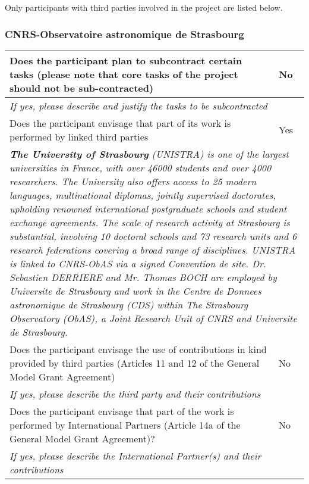 Only participants with third parties involved in the project are listed below.

\subsubsection{CNRS-Observatoire astronomique de Strasbourg}
\begin{tabular}{|p{}|p{}|}\hline
Does the participant plan to subcontract certain tasks (please note that core
tasks of the project should not be sub-contracted) & No\\\hline
%
\multicolumn{2}{|p{\textwidth}|}{
 \textit{If yes, please describe and justify the tasks to be subcontracted}
 }
 \\\hline
%   
Does the participant envisage that part of its work is performed by linked
third parties & Yes\\\hline
%
 \multicolumn{2}{|p{\textwidth}|}{\textit{\textbf{The University of Strasbourg} (UNISTRA) is 
 one of the largest universities in  France, with over 46000 students and over 4000 
 researchers. The University also offers 
 access to 25 modern languages, multinational diplomas, jointly supervised doctorates, 
 upholding renowned international postgraduate schools and student exchange agreements. 
 The scale of research activity at Strasbourg is substantial, involving 10 doctoral schools and 
 73 research units and 6 research federations covering a broad range of disciplines. UNISTRA is linked to
 CNRS-ObAS via a signed Convention de site. Dr. Sebastien DERRIERE and Mr. Thomas 
 BOCH are employed by Universite de Strasbourg and work in the Centre de Donnees 
 astronomique de Strasbourg (CDS) within The Strasbourg Observatory (ObAS), a Joint Research 
 Unit of CNRS and Universite
 de Strasbourg.}}\\\hline
Does the participant envisage the use of contributions in kind provided by third parties (Articles 11 and 12 of
the General Model Grant Agreement) & No\\\hline
%
\multicolumn{2}{|p{\textwidth}|}{
\textit{If yes, please describe the third party and their contributions}
}
\\ \hline
%  
Does the participant envisage that part of the work is performed by International Partners (Article 14a of the
General Model Grant Agreement)? & No\\\hline
%   
\multicolumn{2}{|p{\textwidth}|}{\textit{If yes, please describe the International Partner(s) and 
their contributions}}\\\hline
%
\end{tabular}
%
